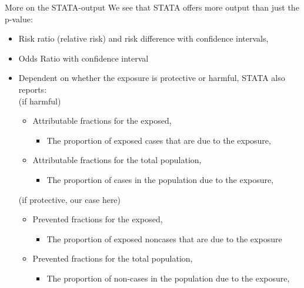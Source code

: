 \documentclass[compress, notes=hide]{beamer}
\begin{document}

\begin{frame}{More on the STATA-output}
	We see that STATA offers more output than just the  p-value:  
	\begin{itemize}
		\item Risk ratio (relative risk) and risk difference with confidence intervals,  
		\item Odds Ratio with confidence interval
		
		\item Dependent on whether the  exposure is protective or harmful, STATA also  reports:\\
		(if harmful)	
		\begin{itemize}
			\item Attributable  fractions for the exposed, 
			\begin{itemize}
				\item The proportion  of exposed cases that  are  due to the exposure,
			\end{itemize}
			\item Attributable fractions for the total population, 
			\begin{itemize}
				\item The proportion  of cases in  the  population due to the exposure,
			\end{itemize}
		\end{itemize}
		(if protective, our case here)
		\begin{itemize}
			\item Prevented fractions for the exposed, \begin{itemize}
				\item The proportion  of exposed noncases that  are  due to the exposure
			\end{itemize}
			\item Prevented fractions for the total population,
			\begin{itemize}
				\item The proportion  of non-cases in  the  population due to the exposure,
			\end{itemize}
			
		\end{itemize}
	\end{itemize}
\end{frame}
\end{document}
